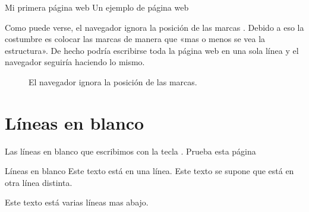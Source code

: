 \documentclass[a4paper,12pt,spanish]{sphinxmanual}
\begin{document}
%
\begin{sphinxVerbatim}[commandchars=\\\{\}]
     Mi primera página web
     Un ejemplo de página web   
\end{sphinxVerbatim}

Como puede verse, el navegador ignora la posición de las marcas . Debido a eso la costumbre es colocar las marcas de manera que «mas o menos se vea la estructura». De hecho podría escribirse toda la página web en una sola línea y el navegador seguiría haciendo lo mismo.

\begin{figure}[htbp]
\centering
\capstart

\noindent{}
\caption{El navegador ignora la posición de las marcas.}\label{\detokenize{index:id9}}\end{figure}


\section{Líneas en blanco}
\label{\detokenize{index:lineas-en-blanco}}
Las líneas en blanco que escribimos con la tecla  . Prueba esta página

%
\begin{sphinxVerbatim}[commandchars=\\\{\}]
         Líneas en blanco
     Este texto está en una línea.
     Este texto se supone que está en otra línea distinta.


     Este texto está varias líneas mas abajo.
\end{sphinxVerbatim}
\end{document}
